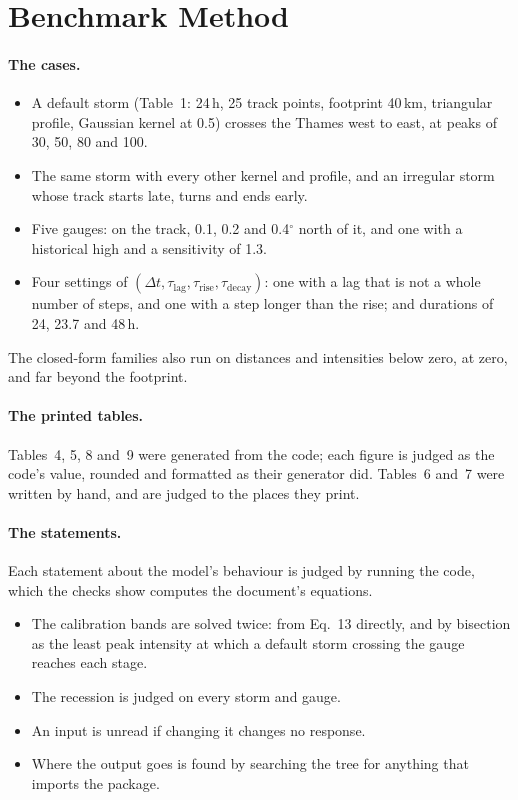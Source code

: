 \documentclass[11pt,a4paper]{article}
\begin{document}
\section{Benchmark Method}

\paragraph{The cases.}
\begin{itemize}[leftmargin=*,nosep]
\item A default storm (Table~1: 24\,h, 25 track points, footprint 40\,km, triangular
  profile, Gaussian kernel at 0.5) crosses the Thames west to east, at peaks of 30,
  50, 80 and 100.
\item The same storm with every other kernel and profile, and an irregular storm whose
  track starts late, turns and ends early.
\item Five gauges: on the track, 0.1, 0.2 and 0.4$^\circ$ north of it, and one with a
  historical high and a sensitivity of 1.3.
\item Four settings of $(\Delta t,\tau_{\mathrm{lag}},\tau_{\mathrm{rise}},
  \tau_{\mathrm{decay}})$: one with a lag that is not a whole number of steps, and one
  with a step longer than the rise; and durations of 24, 23.7 and 48\,h.
\end{itemize}
The closed-form families also run on distances and intensities below zero, at zero,
and far beyond the footprint.

\paragraph{The printed tables.} Tables~4, 5, 8 and~9 were generated from the code; each
figure is judged as the code's value, rounded and formatted as their generator did.
Tables~6 and~7 were written by hand, and are judged to the places they print.

\paragraph{The statements.} Each statement about the model's behaviour is judged by
running the code, which the checks show computes the document's equations.
\begin{itemize}[leftmargin=*,nosep]
\item The calibration bands are solved twice: from Eq.~13 directly, and by bisection as
  the least peak intensity at which a default storm crossing the gauge reaches each
  stage.
\item The recession is judged on every storm and gauge.
\item An input is unread if changing it changes no response.
\item Where the output goes is found by searching the tree for anything that imports
  the package.
\end{itemize}
\end{document}
